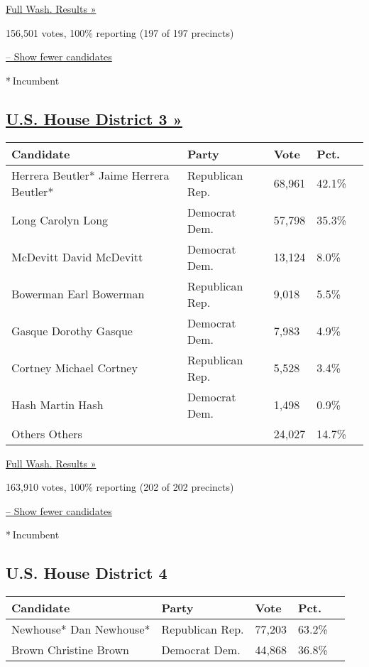 \href{https://www.nytimes3xbfgragh.onion/elections/results/washington}{Full
Wash. Results »}

156,501 votes, 100\% reporting (197 of 197 precincts)

\protect\hyperlink{}{-- Show fewer candidates}

* Incumbent

\hypertarget{us-house-district-3-}{%
\subsection{\texorpdfstring{\href{https://www.nytimes3xbfgragh.onion/elections/results/washington-house-district-3-primary-election}{U.S.
House District 3
»}}{U.S. House District 3 »}}\label{us-house-district-3-}}

\begin{longtable}[]{@{}lllll@{}}
\toprule
Candidate & Party & Vote & Pct. &\tabularnewline
\midrule
\endhead
 Herrera Beutler* Jaime Herrera Beutler* & Republican Rep. & 68,961 &
42.1\% &\tabularnewline
 Long Carolyn Long & Democrat Dem. & 57,798 & 35.3\% &\tabularnewline
 McDevitt David McDevitt & Democrat Dem. & 13,124 & 8.0\%
&\tabularnewline
 Bowerman Earl Bowerman & Republican Rep. & 9,018 & 5.5\%
&\tabularnewline
 Gasque Dorothy Gasque & Democrat Dem. & 7,983 & 4.9\% &\tabularnewline
 Cortney Michael Cortney & Republican Rep. & 5,528 & 3.4\%
&\tabularnewline
 Hash Martin Hash & Democrat Dem. & 1,498 & 0.9\% &\tabularnewline
 Others Others & & 24,027 & 14.7\% &\tabularnewline
\bottomrule
\end{longtable}

\href{https://www.nytimes3xbfgragh.onion/elections/results/washington}{Full
Wash. Results »}

163,910 votes, 100\% reporting (202 of 202 precincts)

\protect\hyperlink{}{-- Show fewer candidates}

* Incumbent

\hypertarget{us-house-district-4}{%
\subsection{U.S. House District 4}\label{us-house-district-4}}

\begin{longtable}[]{@{}lllll@{}}
\toprule
Candidate & Party & Vote & Pct. &\tabularnewline
\midrule
\endhead
 Newhouse* Dan Newhouse* & Republican Rep. & 77,203 & 63.2\%
&\tabularnewline
 Brown Christine Brown & Democrat Dem. & 44,868 & 36.8\%
&\tabularnewline
\bottomrule
\end{longtable}

